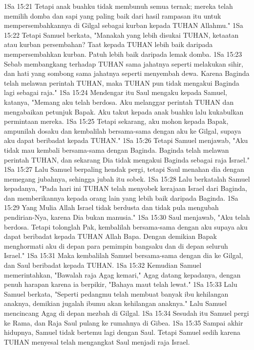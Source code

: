 1Sa 15:21  Tetapi anak buahku tidak membunuh semua ternak; mereka telah memilih domba dan sapi yang paling baik dari hasil rampasan itu untuk mempersembahkannya di Gilgal sebagai kurban kepada TUHAN Allahmu."
1Sa 15:22  Tetapi Samuel berkata, "Manakah yang lebih disukai TUHAN, ketaatan atau kurban persembahan? Taat kepada TUHAN lebih baik daripada mempersembahkan kurban. Patuh lebih baik daripada lemak domba.
1Sa 15:23  Sebab membangkang terhadap TUHAN sama jahatnya seperti melakukan sihir, dan hati yang sombong sama jahatnya seperti menyembah dewa. Karena Baginda telah melawan perintah TUHAN, maka TUHAN pun tidak mengakui Baginda lagi sebagai raja."
1Sa 15:24  Mendengar itu Saul mengaku kepada Samuel, katanya, "Memang aku telah berdosa. Aku melanggar perintah TUHAN dan mengabaikan petunjuk Bapak. Aku takut kepada anak buahku lalu kukabulkan permintaan mereka.
1Sa 15:25  Tetapi sekarang, aku mohon kepada Bapak, ampunilah dosaku dan kembalilah bersama-sama dengan aku ke Gilgal, supaya aku dapat beribadat kepada TUHAN."
1Sa 15:26  Tetapi Samuel menjawab, "Aku tidak mau kembali bersama-sama dengan Baginda. Baginda telah melawan perintah TUHAN, dan sekarang Dia tidak mengakui Baginda sebagai raja Israel."
1Sa 15:27  Lalu Samuel berpaling hendak pergi, tetapi Saul menahan dia dengan memegang jubahnya, sehingga jubah itu sobek.
1Sa 15:28  Lalu berkatalah Samuel kepadanya, "Pada hari ini TUHAN telah menyobek kerajaan Israel dari Baginda, dan memberikannya kepada orang lain yang lebih baik daripada Baginda.
1Sa 15:29  Yang Mulia Allah Israel tidak berdusta dan tidak pula mengubah pendirian-Nya, karena Dia bukan manusia."
1Sa 15:30  Saul menjawab, "Aku telah berdosa. Tetapi tolonglah Pak, kembalilah bersama-sama dengan aku supaya aku dapat beribadat kepada TUHAN Allah Bapa. Dengan demikian Bapak menghormati aku di depan para pemimpin bangsaku dan di depan seluruh Israel."
1Sa 15:31  Maka kembalilah Samuel bersama-sama dengan dia ke Gilgal, dan Saul beribadat kepada TUHAN.
1Sa 15:32  Kemudian Samuel memerintahkan, "Bawalah raja Agag kemari," Agag datang kepadanya, dengan penuh harapan karena ia berpikir, "Bahaya maut telah lewat."
1Sa 15:33  Lalu Samuel berkata, "Seperti pedangmu telah membuat banyak ibu kehilangan anaknya, demikian jugalah ibumu akan kehilangan anaknya." Lalu Samuel mencincang Agag di depan mezbah di Gilgal.
1Sa 15:34  Sesudah itu Samuel pergi ke Rama, dan Raja Saul pulang ke rumahnya di Gibea.
1Sa 15:35  Sampai akhir hidupnya, Samuel tidak bertemu lagi dengan Saul. Tetapi Samuel sedih karena TUHAN menyesal telah mengangkat Saul menjadi raja Israel.
